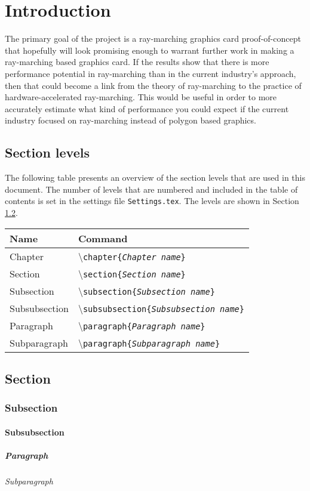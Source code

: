 \chapter{Introduction}
The primary goal of the project is a ray-marching graphics card proof-of-concept that 
hopefully will look promising enough to warrant further work in making a ray-marching based 
graphics card. If the results show that there is more performance potential in ray-marching 
than in the current industry’s approach, then that could become a link from the theory of 
ray-marching to the practice of hardware-accelerated ray-marching. This would be useful in 
order to more accurately estimate what kind of performance you could expect if the current 
industry focused on ray-marching instead of polygon based graphics.

\section{Section levels}
The following table presents an overview of the section levels that are used in this 
document. The number of levels that are numbered and included in the table of contents is 
set in the settings file \texttt{Settings.tex}. 
The levels are shown in Section \ref{Section_ref}.

\begin{table}[H]
\centering
\begin{tabular}{ll} \hline\hline
Name & Command\\ \hline
Chapter & \textbackslash\texttt{chapter\{\emph{Chapter name}\}}\\
Section & \textbackslash\texttt{section\{\emph{Section name}\}}\\
Subsection & \textbackslash\texttt{subsection\{\emph{Subsection name}\}}\\
Subsubsection & \textbackslash\texttt{subsubsection\{\emph{Subsubsection name}\}}\\
Paragraph & \textbackslash\texttt{paragraph\{\emph{Paragraph name}\}}\\
Subparagraph & \textbackslash\texttt{paragraph\{\emph{Subparagraph name}\}}\\ \hline\hline
\end{tabular}
\end{table}

\section{Section} \label{Section_ref}
\subsection{Subsection}
\subsubsection{Subsubsection}
\paragraph{Paragraph}
\subparagraph{Subparagraph}

